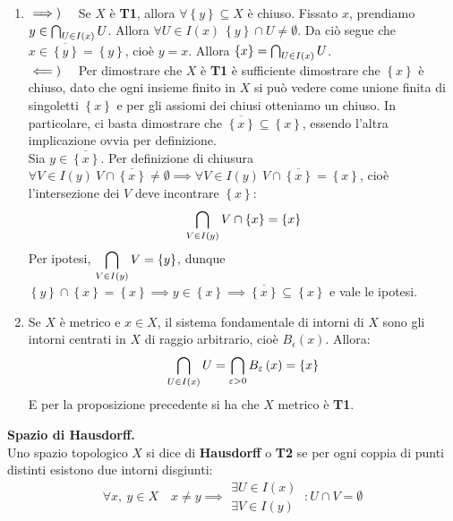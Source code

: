 \begin{demonstration}~{}
\begin{enumerate}[label=\Roman*]
\item $\implies)\quad$ Se $X$ è \textbf{T1}, allora $\forall \left\{y\right\}\subseteq X$ è chiuso. Fissato $x$, prendiamo $y \in \mathop{{\bigcap}}\displaylimits_{U\in I\left(x\right)}U$. Allora $\forall U\in I\left(x\right)\ \left\{y\right\}\cap U\neq \emptyset$. Da ciò segue che $x\in\overline{\left\{y\right\}}=\left\{y\right\}$, cioè $y=x$. Allora $\left\{x\right\}=\mathop{{\bigcap}}\displaylimits_{U\in I\left(x\right)}U$.\\
$\impliedby)\quad$ Per dimostrare che $X$ è \textbf{T1} è sufficiente dimostrare che $\left\{x\right\}$ è chiuso, dato che ogni insieme finito in $X$ si può vedere come unione finita di singoletti $\left\{x\right\}$ e per gli assiomi dei chiusi otteniamo un chiuso. In particolare, ci basta dimostrare che $\overline{\left\{x\right\}}\subseteq \left\{x\right\}$, essendo l'altra implicazione ovvia per definizione.\\
Sia $y\in\overline{\left\{x\right\}}$. Per definizione di chiusura $\forall V\in I\left(y\right)\ V\cap\overline{\left\{x\right\}}\neq\emptyset\implies \forall V\in I\left(y\right)\ V\cap\overline{\left\{x\right\}}=\left\{x\right\}$, cioè l'intersezione dei $V$ deve incontrare $\left\{x\right\}$:
\begin{equation*}
\mathop{{\bigcap}}\displaylimits_{V\in I\left(y\right)}V\cap\left\{x\right\}=\left\{x\right\}
\end{equation*}
Per ipotesi, $\displaystyle \mathop{{\bigcap}}\displaylimits_{V\in I\left(y\right)}V=\left\{y\right\}$, dunque $\left\{y\right\}\cap \left\{x\right\}=\left\{x\right\}\implies y\in\left\{x\right\}\implies\overline{\left\{x\right\}}\subseteq \left\{x\right\}$ e vale le ipotesi.
\item Se $X$ è metrico e $x\in X$, il sistema fondamentale di intorni di $X$ sono gli intorni centrati in $X$ di raggio arbitrario, cioè $B_{\epsilon}\left(x\right)$. Allora:
\begin{equation*}
\mathop{{\bigcap}}\displaylimits_{U\in I\left(x\right)}U=\mathop{{\bigcap}}\displaylimits_{\varepsilon > 0}B_{\varepsilon}\left(x\right)=\left\{x\right\}
\end{equation*}
E per la proposizione precedente si ha che $X$ metrico è \textbf{T1}.
\end{enumerate}
\end{demonstration}
\begin{define}\textbf{Spazio di Hausdorff.}\\
Uno spazio topologico $X$ si dice di \textbf{Hausdorff} o \textbf{T2} se per ogni coppia di punti distinti esistono due intorni disgiunti:
\begin{equation}
	\forall x,\ y\in X\quad x\neq y\implies
	\begin{array}{l}
		\exists U\in I\left(x\right)\\
		\exists V\in I\left(y\right)
	\end{array}
\ \colon U\cap V=\emptyset
\end{equation}
\vspace{-6mm}
\end{define}
